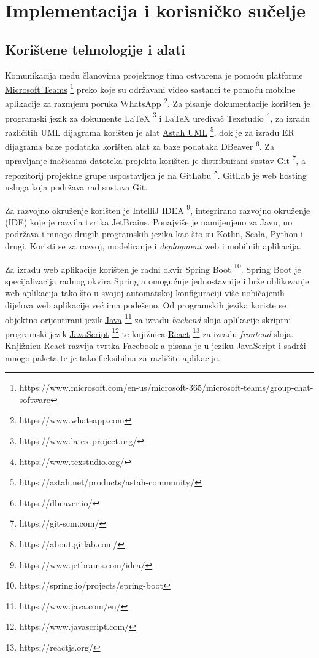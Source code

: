 \chapter{Implementacija i korisničko sučelje}
		
		
		\section{Korištene tehnologije i alati}
		
			 Komunikacija među članovima projektnog tima ostvarena je pomoću platforme  \underline{Microsoft Teams} \footnote{https://www.microsoft.com/en-us/microsoft-365/microsoft-teams/group-chat-software} preko koje su održavani video sastanci te pomoću mobilne aplikacije za razmjenu poruka \underline{WhatsApp}  \footnote{https://www.whatsapp.com}. Za pisanje dokumentacije korišten je programski jezik za dokumente \underline{LaTeX} \footnote{https://www.latex-project.org/} i LaTeX uređivač \underline{Texstudio} \footnote{https://www.texstudio.org/}, za izradu različitih UML dijagrama korišten je alat \underline{Astah UML} \footnote{https://astah.net/products/astah-community/}, dok je za izradu ER dijagrama baze podataka korišten alat za baze podataka \underline{DBeaver} \footnote{https://dbeaver.io/}. Za upravljanje inačicama datoteka projekta korišten je distribuirani sustav \underline{Git} \footnote{https://git-scm.com/}, a repozitorij projektne grupe uspostavljen je na \underline{GitLabu} \footnote{https://about.gitlab.com/}. GitLab je web hosting usluga koja podržava rad sustava Git.
			 
			 Za razvojno okruženje korišten je \underline{IntelliJ IDEA} \footnote{https://www.jetbrains.com/idea/}, integrirano razvojno okruženje (IDE) koje je razvila tvrtka JetBrains. Ponajviše je namijenjeno za Javu, no podržava i mnogo drugih programskih jezika kao što su Kotlin, Scala, Python i drugi. Koristi se za razvoj, modeliranje i \textit{deployment} web i mobilnih aplikacija. 
			 
			 Za izradu web aplikacije korišten je radni okvir \underline{Spring Boot} \footnote{https://spring.io/projects/spring-boot}. Spring Boot je specijalizacija radnog okvira Spring a omogućuje jednostavnije i brže oblikovanje web aplikacija tako što u svojoj automatskoj konfiguraciji više uobičajenih dijelova web aplikacije već ima podešeno. Od programskih jezika koriste se objektno orijentirani jezik \underline{Java} \footnote{https://www.java.com/en/} za izradu \textit{backend} sloja aplikacije  skriptni programski jezik \underline{JavaScript} \footnote{https://www.javascript.com/} te knjižnica \underline{React} \footnote{https://reactjs.org/}  za izradu \textit{frontend} sloja. Knjižnicu React razvija tvrtka Facebook a pisana je u jeziku JavaScript i sadrži mnogo paketa te je tako fleksibilna za različite aplikacije. 
			 
